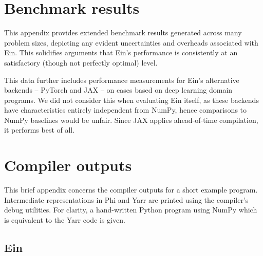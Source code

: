\chapter{Benchmark results}
\label{more-benchmark-results}

This appendix provides extended benchmark results generated across many problem sizes, depicting any evident uncertainties and overheads associated with Ein. This solidifies arguments that Ein's performance is consistently at an satisfactory (though not perfectly optimal) level. 

This data further includes performance measurements for Ein's alternative backends -- PyTorch and JAX -- on cases based on deep learning domain programs. We did not consider this when evaluating Ein itself, as these backends have characteristics entirely independent from NumPy, hence comparisons to NumPy baselines would be unfair. Since JAX applies ahead-of-time compilation, it performs best of all.


\pgfplotsset{width=0.46\textwidth}
\begin{center}


\end{center}
\begin{center}


\end{center}
\begin{center}


\end{center}
\begin{center}


\end{center}

\chapter{Compiler outputs}
\label{compiler-outputs}

This brief appendix concerns the compiler outputs for a short example program. Intermediate representations in Phi and Yarr are printed using the compiler's debug utilities. For clarity, a hand-written Python program using NumPy which is equivalent to the Yarr code is given.

\section*{Ein}

